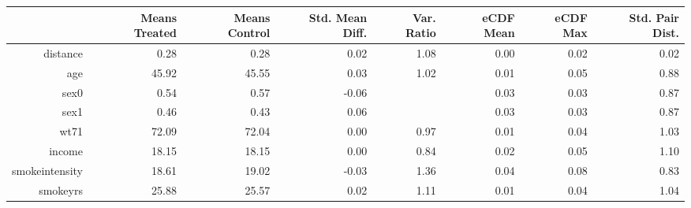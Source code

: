 \begin{table}[ht]
\centering
\begin{tabular}{rrrrrrrr}
  \hline
 & Means Treated & Means Control & Std. Mean Diff. & Var. Ratio & eCDF Mean & eCDF Max & Std. Pair Dist. \\ 
  \hline
distance & 0.28 & 0.28 & 0.02 & 1.08 & 0.00 & 0.02 & 0.02 \\ 
  age & 45.92 & 45.55 & 0.03 & 1.02 & 0.01 & 0.05 & 0.88 \\ 
  sex0 & 0.54 & 0.57 & -0.06 &  & 0.03 & 0.03 & 0.87 \\ 
  sex1 & 0.46 & 0.43 & 0.06 &  & 0.03 & 0.03 & 0.87 \\ 
  wt71 & 72.09 & 72.04 & 0.00 & 0.97 & 0.01 & 0.04 & 1.03 \\ 
  income & 18.15 & 18.15 & 0.00 & 0.84 & 0.02 & 0.05 & 1.10 \\ 
  smokeintensity & 18.61 & 19.02 & -0.03 & 1.36 & 0.04 & 0.08 & 0.83 \\ 
  smokeyrs & 25.88 & 25.57 & 0.02 & 1.11 & 0.01 & 0.04 & 1.04 \\ 
   \hline
\end{tabular}
\end{table}
